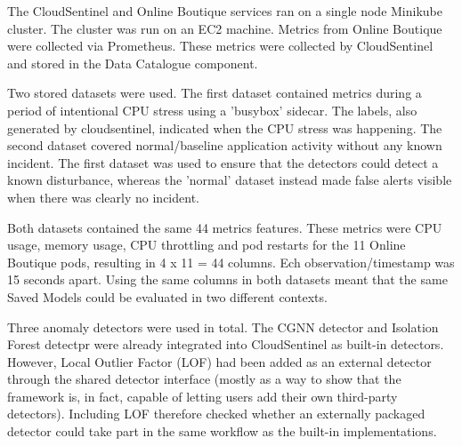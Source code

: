 

The CloudSentinel and Online Boutique services ran on a single node Minikube cluster. The cluster was run on an EC2 machine. Metrics from Online Boutique were collected via Prometheus. These metrics were collected by CloudSentinel and stored in the Data Catalogue component.

Two stored datasets were used. The first dataset contained metrics during a period of intentional CPU stress using a 'busybox' sidecar. The labels, also generated by cloudsentinel, indicated when the CPU stress was happening. The second dataset covered normal/baseline application activity without any known incident. The first dataset was used to ensure that the detectors could detect a known disturbance, whereas the 'normal' dataset instead made false alerts visible when there was clearly no incident.

Both datasets contained the same 44 metrics features. These metrics were CPU usage, memory usage, CPU throttling and pod restarts for the 11 Online Boutique pods,  resulting in 4 x 11 = 44 columns. Ech observation/timestamp was 15 seconds apart. Using the same columns in both datasets meant that the same Saved Models could be evaluated in two different contexts.

Three anomaly detectors were used in total. The CGNN detector and Isolation Forest detectpr were already integrated into CloudSentinel as built-in detectors. However,  Local Outlier Factor (LOF) had been added as an external detector through the shared detector interface (mostly as a way to show that the framework is, in fact, capable of letting users add their own third-party detectors). Including LOF therefore checked whether an externally packaged detector could take part in the same workflow as the built-in implementations.

